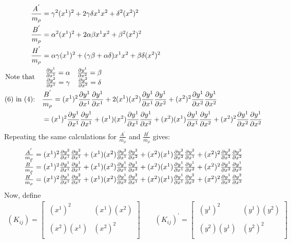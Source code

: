 \begin {align}
\ \frac{A^{'}}{m_{\rho}}  &= \gamma^2 (x^1)^2+2 \gamma \delta x^1 x^2 + \delta ^2 (x^2)^2\\
\  \frac{B^{'}}{m_{\rho}}  &= \alpha^2 (x^1)^2+2 \alpha \beta x^1 x^2 + \beta ^2 (x^2)^2\\
\  \frac{H^{'}}{m_{\rho}}  &= \alpha \gamma (x^1)^2 + (\gamma \beta + \alpha \delta) x^1 x^2 + \beta \delta (x^2)^2\\
\text{Note that} \quad &\begin{array}{cc}
  \pdv{y^1}{x^1} = \alpha & \pdv{y^1}{x^2} = \beta\\ 
	\pdv{y^2}{x^1} = \gamma & \pdv{y^2}{x^2} = \delta\\ 
  \end{array}\\
  \text{(6) in  (4):}\quad &\frac{B^{'}}{m_{\rho}} =  (x^1)^2\pdv{y^1}{x^1} \pdv{y^1}{x^1}  + 2 (x^1)(x^2)\pdv{y^1}{x^1}\pdv{y^1}{x^2} + (x^2)^2\pdv{y^1}{x^2}\pdv{y^1}{x^2}\\
  &=  (x^1)^2\pdv{y^1}{x^1} \pdv{y^1}{x^1}  +  (x^1)(x^2)\pdv{y^1}{x^1}\pdv{y^1}{x^2} + (x^2)(x^1)\pdv{y^1}{x^1}\pdv{y^1}{x^2} + (x^2)^2\pdv{y^1}{x^2}\pdv{y^1}{x^2}
\end{align}
Repeating the same calculations for $\frac{A^{'}}{m_{\rho}}$ and $\frac{H^{'}}{m_{\rho}} $ gives:
\begin {align}
\begin{array}{c}
\frac{A^{'}}{m_{\rho}} =  (x^1)^2\pdv{y^2}{x^1} \pdv{y^2}{x^1}  +  (x^1)(x^2)\pdv{y^2}{x^1}\pdv{y^2}{x^2} + (x^2)(x^1)\pdv{y^2}{x^2}\pdv{y^2}{x^1} + (x^2)^2\pdv{y^2}{x^2}\pdv{y^2}{x^2}\\
\frac{B^{'}}{m_{\rho}} =  (x^1)^2\pdv{y^1}{x^1} \pdv{y^1}{x^1}  +  (x^1)(x^2)\pdv{y^1}{x^1}\pdv{y^1}{x^2} + (x^2)(x^1)\pdv{y^1}{x^1}\pdv{y^1}{x^2} + (x^2)^2\pdv{y^1}{x^2}\pdv{y^1}{x^2}\\
\frac{H^{'}}{m_{\rho}} =  (x^1)^2\pdv{y^1}{x^1} \pdv{y^2}{x^1}  +  (x^1)(x^2)\pdv{y^1}{x^2}\pdv{y^2}{x^1} + (x^2)(x^1)\pdv{y^1}{x^1}\pdv{y^2}{x^2} + (x^2)^2\pdv{y^1}{x^2}\pdv{y^2}{x^2}
  \end{array}
\end{align}
Now, define 
\begin{align}
(K_{ij}) = \left[ { \begin{array}{cc}
  \ (x^1)^2 &  (x^1)(x^2)\\\\
  \ (x^2)(x^1)  & (x^2)^2\\
  \end{array}} \right] \quad \quad (K_{ij})^{'} = \left[ { \begin{array}{cc}
  \ (y^1)^2 &  (y^1)(y^2)\\\\
  \ (y^2)(y^1)  & (y^2)^2\\
  \end{array}} \right]
\end{align}
